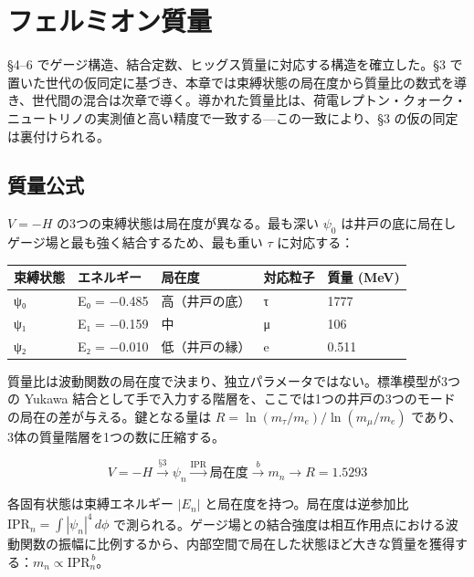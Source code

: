 \documentclass[fontsize=11pt,paper=a4,lualatex]{jlreq}
\begin{document}
\section{フェルミオン質量}\label{ux30d5ux30a7ux30ebux30dfux30aaux30f3ux306eux8ceaux91cfux3068ux6df7ux5408}

§4--6 でゲージ構造、結合定数、ヒッグス質量に対応する構造を確立した。§3 で置いた世代の仮同定に基づき、本章では束縛状態の局在度から質量比の数式を導き、世代間の混合は次章で導く。導かれた質量比は、荷電レプトン・クォーク・ニュートリノの実測値と高い精度で一致する---この一致により、§3 の仮の同定は裏付けられる。

\subsection{質量公式}\label{ux8ceaux91cfux516cux5f0f}

$V = -H$ の3つの束縛状態は局在度が異なる。最も深い $\psi_0$ は井戸の底に局在しゲージ場と最も強く結合するため、最も重い $\tau$ に対応する：

\begin{longtable}[]{@{}lllll@{}}
\toprule\noalign{}
束縛状態 & エネルギー & 局在度 & 対応粒子 & 質量 (MeV) \\
\midrule\noalign{}
\endhead
\bottomrule\noalign{}
\endlastfoot
ψ₀ & E₀ = −0.485 & 高（井戸の底） & τ & 1777 \\
ψ₁ & E₁ = −0.159 & 中 & μ & 106 \\
ψ₂ & E₂ = −0.010 & 低（井戸の縁） & e & 0.511 \\
\end{longtable}

質量比は波動関数の局在度で決まり、独立パラメータではない。標準模型が3つの Yukawa 結合として手で入力する階層を、ここでは1つの井戸の3つのモードの局在の差が与える。鍵となる量は $R = \ln(m_\tau/m_e)/\ln(m_\mu/m_e)$ であり、3体の質量階層を1つの数に圧縮する。

\[V = -H \xrightarrow{\text{§3}} \psi_n \xrightarrow{\text{IPR}} \text{局在度} \xrightarrow{b} m_n \xrightarrow{} R = 1.5293\]

各固有状態は束縛エネルギー $|E_n|$ と局在度を持つ。局在度は逆参加比 $\mathrm{IPR}_n = \int|\psi_n|^4\,d\phi$ で測られる。ゲージ場との結合強度は相互作用点における波動関数の振幅に比例するから、内部空間で局在した状態ほど大きな質量を獲得する：$m_n \propto \mathrm{IPR}_n^{\,b}$。
\end{document}
